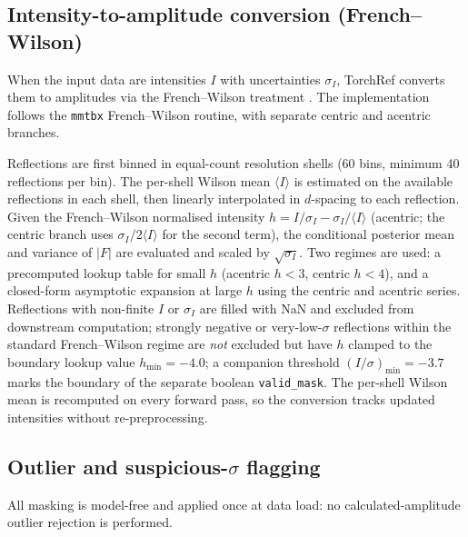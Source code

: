 \documentclass{iucrjournals}
\begin{document}
\subsection{Intensity-to-amplitude conversion (French--Wilson)}

When the input data are intensities $I$ with uncertainties $\sigma_{I}$,
TorchRef converts them to amplitudes via the French--Wilson treatment
\cite{french_treatment_1978}.  The implementation follows the \texttt{mmtbx}
French--Wilson routine, with separate centric and acentric
branches.

Reflections are first binned in equal-count resolution shells (60 bins,
minimum 40 reflections per bin).  The per-shell Wilson mean $\langle I \rangle$
is estimated on the available reflections in each shell, then linearly
interpolated in $d$-spacing to each reflection.  Given the French--Wilson
normalised intensity $h = I/\sigma_{I} - \sigma_{I}/\langle I \rangle$
(acentric; the centric branch uses $\sigma_{I}/2\langle I \rangle$ for the
second term), the conditional posterior mean and variance of $|F|$ are
evaluated and scaled by $\sqrt{\sigma_{I}}$.  Two regimes are used: a precomputed lookup table for
small $h$ (acentric $h<3$, centric $h<4$), and a closed-form asymptotic
expansion at large $h$ using the centric and acentric series.
%
Reflections with non-finite $I$ or $\sigma_{I}$ are filled with NaN and
excluded from downstream computation; strongly negative or very-low-$\sigma$
reflections within the standard French--Wilson regime are
\emph{not} excluded but have $h$ clamped to the boundary lookup value
$h_{\min} = -4.0$; a companion threshold $(I/\sigma)_{\min} = -3.7$ marks
the boundary of the separate boolean \texttt{valid\_mask}.  The per-shell
Wilson mean is recomputed on every forward pass, so the conversion tracks
updated intensities without re-preprocessing.

\subsection{Outlier and suspicious-$\sigma$ flagging}

All masking is model-free and applied once at data load: no calculated-amplitude
outlier rejection is performed.
\end{document}
